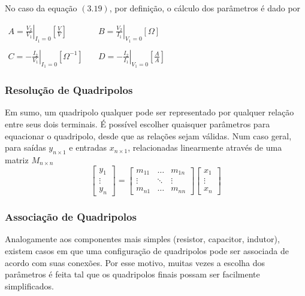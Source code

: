 \documentclass{article}
\numberwithin{equation}{section}
\begin{document}
    No caso da equação $(3.19)$, por definição, o cálculo dos parâmetros é dado por
    \begin{center}
        $\begin{matrix} %
                A=\displaystyle\left.\frac{V_{2}}{V_{1}}\right|_{I_{1}=0} \left[\frac{V}{V}\right] &\quad B=\displaystyle\left.\frac{V_{2}}{I_{1}}\right|_{V_{1}=0}[\Omega]\\\\
                C=\displaystyle\left.-\frac{I_{2}}{V_{1}}\right|_{I_{1}=0}[\Omega^{-1}]&\quad
                D=\displaystyle\left.-\frac{I_{2}}{I_{1}}\right|_{V_{1}=0}\left[\frac{A}{A}\right]
        \end{matrix}$
    \end{center}

    \subsubsection{Resolução de Quadripolos}
    \label{subsubsec:quadripolosgenerico}
    Em sumo, um quadripolo qualquer pode ser representado por qualquer relação entre seus dois terminais. É possível escolher quaisquer parâmetros para equacionar o quadripolo, desde que as relações sejam válidas. Num caso geral, para saídas $y_{n\times1}$ e entradas $x_{n\times1}$, relacionadas linearmente através de uma matriz $M_{n\times n}$
    \begin{equation*}
        \begin{bmatrix}
            y_{1} \\
            \vdots\\
            y_{n}
        \end{bmatrix}
        = %
        \begin{bmatrix}
            m_{11} & \dots & m_{1n}\\
            \vdots & \ddots& \vdots\\
            m_{n1} & \dots & m_{nn}
        \end{bmatrix}
        \begin{bmatrix}
            x_{1} \\
            \vdots\\
            x_{n}
        \end{bmatrix}
    \end{equation*}

    \subsubsection{Associação de Quadripolos}
    \label{subsubsec:quadripolosassociacao}
    Analogamente aos componentes mais simples (resistor, capacitor, indutor), existem casos em que uma configuração de quadripolos pode ser associada de acordo com suas conexões. Por esse motivo, muitas vezes a escolha dos parâmetros é feita tal que os quadripolos finais possam ser facilmente simplificados.
\end{document}
